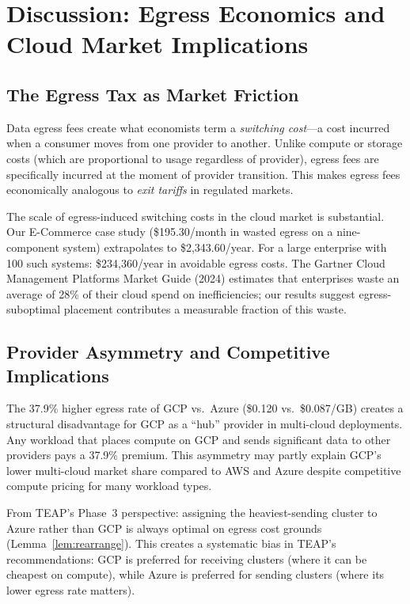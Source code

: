 \documentclass[10pt,journal]{IEEEtran}
\begin{document}
\section{Discussion: Egress Economics and Cloud Market Implications}\label{sec:economics}

\subsection{The Egress Tax as Market Friction}

Data egress fees create what economists term a \emph{switching cost}---a cost
incurred when a consumer moves from one provider to another.
Unlike compute or storage costs (which are proportional to usage regardless of
provider), egress fees are specifically incurred at the moment of provider transition.
This makes egress fees economically analogous to \emph{exit tariffs} in regulated
markets.

The scale of egress-induced switching costs in the cloud market is substantial.
Our E-Commerce case study (\$195.30/month in wasted egress on a nine-component
system) extrapolates to \$2,343.60/year.
For a large enterprise with 100 such systems: \$234,360/year in avoidable egress
costs.
The Gartner Cloud Management Platforms Market Guide (2024) estimates that
enterprises waste an average of 28\% of their cloud spend on inefficiencies;
our results suggest egress-suboptimal placement contributes a measurable fraction
of this waste.

\subsection{Provider Asymmetry and Competitive Implications}

The 37.9\% higher egress rate of GCP vs.\ Azure (\$0.120 vs.\ \$0.087/GB)
creates a structural disadvantage for GCP as a ``hub'' provider in multi-cloud
deployments.
Any workload that places compute on GCP and sends significant data to other providers
pays a 37.9\% premium.
This asymmetry may partly explain GCP's lower multi-cloud market share compared
to AWS and Azure despite competitive compute pricing for many workload types.

From TEAP's Phase~3 perspective: assigning the heaviest-sending cluster to Azure
rather than GCP is always optimal on egress cost grounds (Lemma~\ref{lem:rearrange}).
This creates a systematic bias in TEAP's recommendations: GCP is preferred for
receiving clusters (where it can be cheapest on compute), while Azure is preferred
for sending clusters (where its lower egress rate matters).
\end{document}
